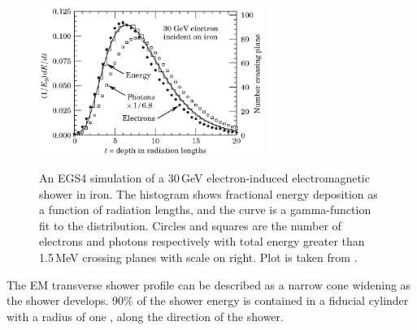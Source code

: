 

\begin{figure}[tbph]
\centering
{\includegraphics[width=0.65\textwidth]{photon/EMlong}}
\caption[Simulated longitudinal electromagnetic shower profile as a function of depth for electrons and photons.]
{An EGS4 simulation of a 30\,GeV electron-induced electromagnetic shower in iron. The histogram shows fractional energy deposition as a function of radiation lengths, and the curve is a gamma-function fit to the distribution. Circles and squares are the number of electrons and photons respectively with total energy greater than 1.5\,MeV crossing planes with scale on right. Plot is taken from \cite{Agashe:2014kda}.}
\label{fig:photonEMlongProfile}
\end{figure}

The EM transverse shower profile can be described as  a narrow cone widening as the shower develops. 90\% of the shower energy  is contained in a fiducial cylinder with a radius of one \RM, along the direction of the shower.






